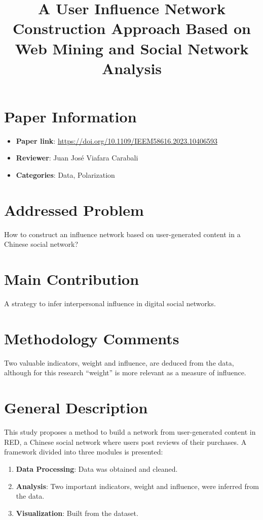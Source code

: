 \documentclass{article}
\title{A User Influence Network Construction Approach Based on Web Mining and Social Network Analysis}
\author{}
\date{}
\begin{document}
\maketitle

\section*{Paper Information}
\begin{itemize}
    \item \textbf{Paper link}: \url{https://doi.org/10.1109/IEEM58616.2023.10406593}
    \item \textbf{Reviewer}: Juan José Viafara Carabali
    \item \textbf{Categories}: Data, Polarization
\end{itemize}

\section*{Addressed Problem}
How to construct an influence network based on user-generated content in a Chinese social network?

\section*{Main Contribution}
A strategy to infer interpersonal influence in digital social networks.

\section*{Methodology Comments}
Two valuable indicators, weight and influence, are deduced from the data, although for this research “weight” is more relevant as a measure of influence.

\section*{General Description}
This study proposes a method to build a network from user-generated content in RED, a Chinese social network where users post reviews of their purchases. A framework divided into three modules is presented:
\begin{enumerate}
    \item \textbf{Data Processing}: Data was obtained and cleaned.
    \item \textbf{Analysis}: Two important indicators, weight and influence, were inferred from the data.
    \item \textbf{Visualization}: Built from the dataset.
\end{enumerate}
\end{document}

